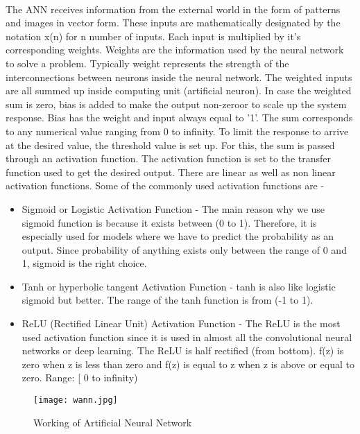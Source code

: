 \documentclass[a4paper,12pt]{report}
\begin{document}
\paragraph{}
The ANN receives information from the external world in the form of patterns and images in vector form. These inputs are mathematically designated by the notation x(n) for n number of inputs. Each input is multiplied by it's corresponding weights. Weights are the information used by the neural network to solve a problem. Typically weight represents the strength of the interconnections between neurons inside the neural network. The weighted inputs are all summed up inside computing unit (artificial neuron). In case the weighted sum is zero, bias is added to make the output non-zeroor to scale up the system response. Bias has the weight and input always equal to '1'. The sum corresponds to any numerical value ranging from 0 to infinity. To limit the response to arrive at the desired value, the threshold value is set up. For this, the sum is passed through an activation function. The activation function is set to the transfer function used to get the desired output. There are linear as well as non linear activation functions. Some of the commonly used activation functions are - 
\begin{itemize}
\item Sigmoid or Logistic Activation Function - The main reason why we use sigmoid function is because it exists between (0 to 1). Therefore, it is especially used for models where we have to predict the probability as an output. Since probability of anything exists only between the range of 0 and 1, sigmoid is the right choice.
\item  Tanh or hyperbolic tangent Activation Function - tanh is also like logistic sigmoid but better. The range of the tanh function is from (-1 to 1).
\item ReLU (Rectified Linear Unit) Activation Function - The ReLU is the most used activation function since it is used in almost all the convolutional neural networks or deep learning. The ReLU is half rectified (from bottom). f(z) is zero when z is less than zero and f(z) is equal to z when z is above or equal to zero. Range: [ 0 to infinity)
\end{itemize}

\vspace*{1cm}
\begin{figure}[!h]
	\begin{center}
		\texttt{[image: wann.jpg]}    
		\caption{Working of Artificial Neural Network}
		\label{fig1}
	\end{center}
\end{figure}
\end{document}
